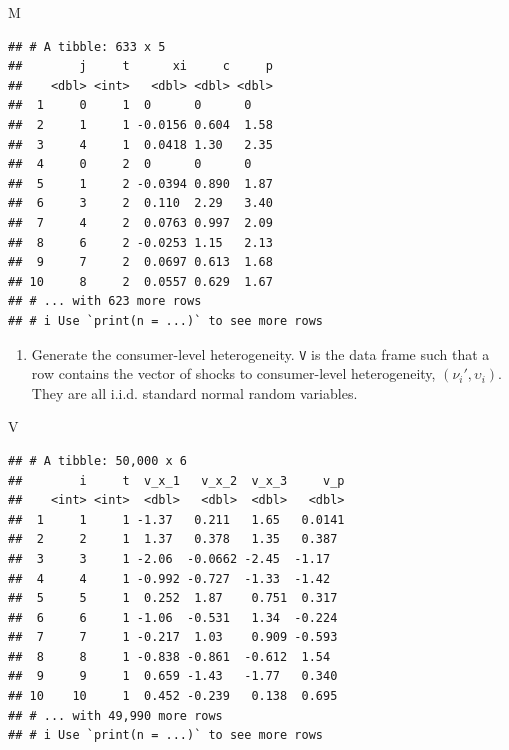 \documentclass[
]{book}
\newenvironment{Shaded}{\begin{snugshade}}{\end{snugshade}}
\newcommand{\NormalTok}[1]{#1}
\providecommand{\tightlist}{%
  \setlength{\itemsep}{0pt}\setlength{\parskip}{0pt}}
\begin{document}
\begin{Shaded}
\begin{Highlighting}[]
\NormalTok{M}
\end{Highlighting}
\end{Shaded}

\begin{verbatim}
## # A tibble: 633 x 5
##        j     t      xi     c     p
##    <dbl> <int>   <dbl> <dbl> <dbl>
##  1     0     1  0      0      0   
##  2     1     1 -0.0156 0.604  1.58
##  3     4     1  0.0418 1.30   2.35
##  4     0     2  0      0      0   
##  5     1     2 -0.0394 0.890  1.87
##  6     3     2  0.110  2.29   3.40
##  7     4     2  0.0763 0.997  2.09
##  8     6     2 -0.0253 1.15   2.13
##  9     7     2  0.0697 0.613  1.68
## 10     8     2  0.0557 0.629  1.67
## # ... with 623 more rows
## # i Use `print(n = ...)` to see more rows
\end{verbatim}

\begin{enumerate}
\def\labelenumi{\arabic{enumi}.}
\setcounter{enumi}{3}
\tightlist
\item
  Generate the consumer-level heterogeneity. \texttt{V} is the data frame such that a row contains the vector of shocks to consumer-level heterogeneity, \((\nu_{i}', \upsilon_i)\). They are all i.i.d. standard normal random variables.
\end{enumerate}

\begin{Shaded}
\begin{Highlighting}[]
\NormalTok{V}
\end{Highlighting}
\end{Shaded}

\begin{verbatim}
## # A tibble: 50,000 x 6
##        i     t  v_x_1   v_x_2  v_x_3     v_p
##    <int> <int>  <dbl>   <dbl>  <dbl>   <dbl>
##  1     1     1 -1.37   0.211   1.65   0.0141
##  2     2     1  1.37   0.378   1.35   0.387 
##  3     3     1 -2.06  -0.0662 -2.45  -1.17  
##  4     4     1 -0.992 -0.727  -1.33  -1.42  
##  5     5     1  0.252  1.87    0.751  0.317 
##  6     6     1 -1.06  -0.531   1.34  -0.224 
##  7     7     1 -0.217  1.03    0.909 -0.593 
##  8     8     1 -0.838 -0.861  -0.612  1.54  
##  9     9     1  0.659 -1.43   -1.77   0.340 
## 10    10     1  0.452 -0.239   0.138  0.695 
## # ... with 49,990 more rows
## # i Use `print(n = ...)` to see more rows
\end{verbatim}
\end{document}
